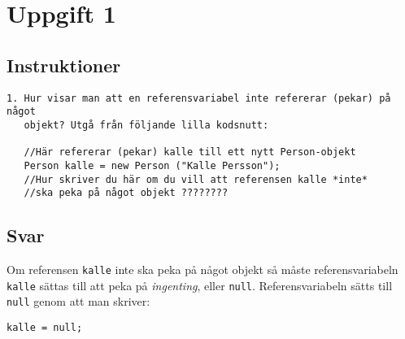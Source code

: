 \section{Uppgift 1}\label{sec:uppg01}

\subsection{Instruktioner}
\begin{verbatim}
1. Hur visar man att en referensvariabel inte refererar (pekar) på något
   objekt? Utgå från följande lilla kodsnutt:

   //Här refererar (pekar) kalle till ett nytt Person-objekt
   Person kalle = new Person ("Kalle Persson");
   //Hur skriver du här om du vill att referensen kalle *inte*
   //ska peka på något objekt ????????
\end{verbatim}


\subsection{Svar}
Om referensen \texttt{kalle} inte ska peka på något objekt så måste
referensvariabeln \texttt{kalle} sättas till att peka på \emph{ingenting},
eller \texttt{null}.  Referensvariabeln sätts till \texttt{null} genom att man
skriver:
\begin{verbatim}kalle = null;\end{verbatim}

